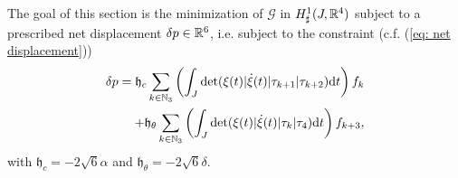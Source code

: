 The goal of this section is the minimization of $\mathcal{G}$ in $H_{\sharp}^1(J, \mathbb{R}^4)$ subject to a prescribed net displacement $\delta p \in \mathbb{R}^6$, i.e. subject to the constraint (c.f. (\ref{eq: net displacement}))
\begin{equation}
\label{eq: constraint}
\begin{aligned}
	 \delta p = \mathfrak{h}_{c} \sum_{k \in \mathbb{N}_3}\left ( \int_{J} \det( \xi(t) | \dot{\xi}(t) | \tau_{k+1} | \tau_{k+2}) \mathrm{d}t \right ) f_k\\
	+ \mathfrak{h}_{\theta}  \sum_{k \in \mathbb{N}_3}\left ( \int_{J} \det ( \xi(t) | \dot{\xi}(t) | \tau_{k} | \tau_{4}) \mathrm{d}t\right ) f_{k + 3},
\end{aligned}
\end{equation}
with $\mathfrak{h}_c = - 2 \sqrt{6} \alpha$ and $\mathfrak{h}_{\theta} = - 2 \sqrt{6} \delta$.


